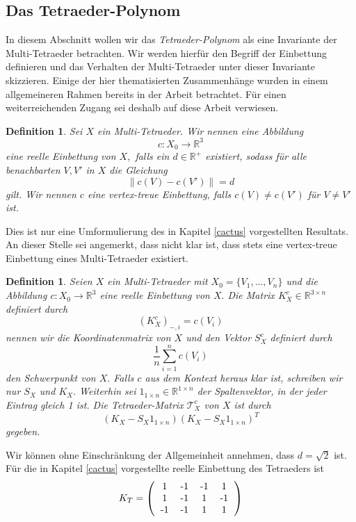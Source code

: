 \documentclass[12pt,titlepage,twoside,cleardoublepage]{article}
\theoremstyle{nummermitklammern}
\newtheorem{definition}[temp]{Definition}
\newtheorem{definition}[zahl]{Definition}
\numberwithin{equation}{section}
\begin{document}
\subsection{Das Tetraeder-Polynom}\label{eigenwerte}
In diesem Abschnitt wollen wir das \emph{Tetraeder-Polynom} als eine Invariante der Multi-Tetraeder betrachten. Wir werden hierfür den Begriff der Einbettung definieren und das Verhalten der Multi-Tetraeder unter dieser Invariante skizzieren. Einige der hier thematisierten Zusammenhänge  wurden in einem allgemeineren Rahmen bereits in der Arbeit \cite{ans} betrachtet. Für einen weiterreichenden Zugang sei deshalb auf diese Arbeit verwiesen.
\begin{definition}
Sei $X$ ein Multi-Tetraeder. Wir nennen eine Abbildung 
\[
c:X_0\to \mathbb{R}^3
\]
eine \emph{reelle Einbettung} von $X,$ falls ein $d\in \mathbb{R}^+$ existiert, sodass für alle benachbarten $V,V'$ in $X$ die Gleichung
\[
\| c(V)-c(V')\|=d
\] 
gilt. Wir nennen $c$ eine \emph{vertex-treue} Einbettung, falls $c(V)\neq c(V')$ für $V\neq V'$ ist.
\end{definition}
Dies ist nur eine Umformulierung des in Kapitel \ref{cactus} vorgestellten Resultats. An dieser Stelle sei angemerkt, dass nicht klar ist, dass stets eine vertex-treue Einbettung eines Multi-Tetraeder existiert.
\begin{definition}
Seien $X$ ein Multi-Tetraeder mit $ X_0=\{V_1,\ldots,V_n\} $ und die Abbildung $c:X_0\to \mathbb{R}^3$ eine reelle Einbettung von $X.$ Die Matrix $K^c_X\in \mathbb{R}^{3\times n}$ definiert durch
\[
(K^c_X)_{-,i}=c(V_i)
\] 
nennen wir die \emph{Koordinatenmatrix} von $X$ und den Vektor $S^c_X$ definiert durch 
\[
\frac{1}{n}\sum_{i=1}^nc(V_i)
\] den \emph{Schwerpunkt} von $X.$
Falls $c$ aus dem Kontext heraus klar ist, schreiben wir nur $S_X$ und $K_X.$
Weiterhin sei $1_{1\times n}\in \mathbb{R}^{1\times n}$ der Spaltenvektor, in der jeder Eintrag gleich 1 ist. Die \emph{Tetraeder-Matrix} $\mathcal{T}^c_X$ von $X$ ist durch
\[
(K_X-S_X1_{1\times n})(K_X-S_X1_{1\times n})^T
\] 
gegeben. 
\end{definition} 
Wir können ohne Einschränkung der Allgemeinheit annehmen, dass $d=\sqrt{2}$ ist. 
Für die in Kapitel \ref{cactus} vorgestellte reelle  Einbettung des Tetraeders ist
\[
K_T=\left(\begin{tabular}{cccc}
1&-1&-1&1\\
1&-1&1&-1\\
-1&-1&1&1\\
\end{tabular}\right)
\] 
\end{document}
